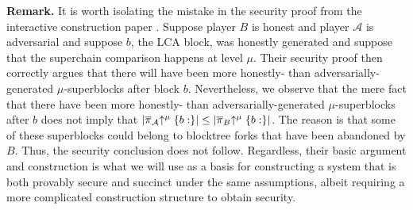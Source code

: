 \noindent\textbf{Remark.}
It is worth isolating the mistake in the security proof from
the interactive construction paper \cite{KLS}. Suppose player $B$ is honest and
player $\mathcal{A}$ is adversarial and suppose $b$, the LCA block, was honestly
generated and suppose that the superchain comparison happens at level $\mu$.
Their security proof then correctly argues that there will have been more
honestly- than adversarially-generated $\mu$-superblocks after block $b$.
Nevertheless, we observe that the mere fact that there have been more honestly-
than adversarially-generated $\mu$-superblocks after $b$ does not imply that
$|\overline\pi_\mathcal{A}\negthickspace\uparrow^\mu\{b:\}| \leq
|\overline\pi_B\negthickspace\uparrow^\mu\{b:\}|$. The reason is that some of these
superblocks could belong to blocktree forks that have been abandoned by $B$.
Thus, the security conclusion does not follow. Regardless, their basic argument
and construction is what we will use as a basis for constructing a system that
is both provably secure and succinct under the same assumptions, albeit
requiring a more complicated construction structure to obtain security.
